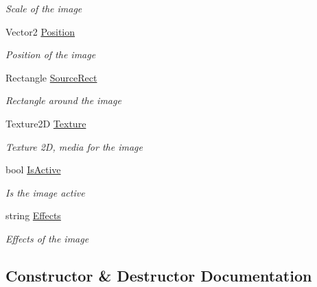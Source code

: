\begin{DoxyCompactItemize}
\begin{DoxyCompactList}\small\item\em Scale of the image \end{DoxyCompactList}\item 
Vector2 \hyperlink{class_hel_project_1_1_u_i_1_1_image_a5411311ded8aaad6a7701ebf85cf4195}{Position}
\begin{DoxyCompactList}\small\item\em Position of the image \end{DoxyCompactList}\item 
Rectangle \hyperlink{class_hel_project_1_1_u_i_1_1_image_a1a24007d692268d32842ec757a5c1c9c}{Source\+Rect}
\begin{DoxyCompactList}\small\item\em Rectangle around the image \end{DoxyCompactList}\item 
Texture2\+D \hyperlink{class_hel_project_1_1_u_i_1_1_image_ac8ab89b0c7e2d4475dcfb514b213d783}{Texture}
\begin{DoxyCompactList}\small\item\em Texture 2\+D, media for the image \end{DoxyCompactList}\item 
bool \hyperlink{class_hel_project_1_1_u_i_1_1_image_a72bf2602af719c9760401cdfc60833fb}{Is\+Active}
\begin{DoxyCompactList}\small\item\em Is the image active \end{DoxyCompactList}\item 
string \hyperlink{class_hel_project_1_1_u_i_1_1_image_a0dbd14214284f081dda6ca93590bede8}{Effects}
\begin{DoxyCompactList}\small\item\em Effects of the image \end{DoxyCompactList}\end{DoxyCompactItemize}


\subsection{Constructor \& Destructor Documentation}
\hypertarget{class_hel_project_1_1_u_i_1_1_image_a5f0954bae0cb16899551a81480d8a420}{}
